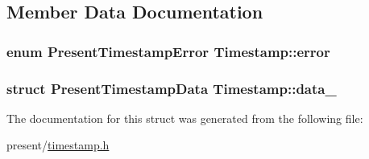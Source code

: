 \subsection{\-Member \-Data \-Documentation}
\hypertarget{structTimestamp_a2ac4b53468d2a270e2ba5f05af9d7472}{
\subsubsection[{error}]{\setlength{\rightskip}{0pt plus 5cm}enum {\bf \-Present\-Timestamp\-Error} {\bf \-Timestamp\-::error}}}\label{structTimestamp_a2ac4b53468d2a270e2ba5f05af9d7472}
\hypertarget{structTimestamp_adf3177050edc50aa8b6e768922e4cf56}{
\subsubsection[{data\-\_\-}]{\setlength{\rightskip}{0pt plus 5cm}struct \-Present\-Timestamp\-Data {\bf \-Timestamp\-::data\-\_\-}}}\label{structTimestamp_adf3177050edc50aa8b6e768922e4cf56}


\-The documentation for this struct was generated from the following file\-:\begin{DoxyCompactItemize}
\item 
present/\hyperlink{timestamp_8h}{timestamp.\-h}\end{DoxyCompactItemize}
